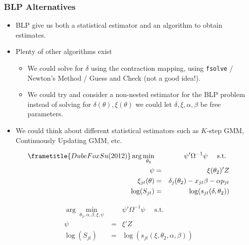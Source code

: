 \documentclass[xcolor=pdftex,dvipsnames,table,mathserif]{beamer}
\begin{document}
 \begin{frame}
\frametitle{BLP Alternatives}
\begin{itemize}
 \item BLP give us both a statistical \alert{estimator} and an \alert{algorithm} to obtain estimates.
\item Plenty of other algorithms exist
\begin{itemize}
\item We could solve for $\delta$ using the contraction mapping, using \texttt{fsolve} / Newton's Method / Guess and Check (not a good idea!).
\item We could try and consider a non-nested estimator for the BLP problem instead of solving for $\delta(\theta),\xi(\theta)$ we could let $\delta,\xi,\alpha,\beta$ be free parameters.
 \end{itemize}
\item We could think about different statistical estimators such as $K$-step GMM, Continuously Updating GMM, etc.
 \end{itemize}
\end{frame}
 \begin{frame}
 
\begin{eqnarray}
\frametitle{Dube Fox Su (2012)}
\label{blpnfxp}
\nonumber \arg \min_{\theta_2} && \psi' \Omega^{-1} \psi \quad \mbox{ s.t. } \\
\nonumber \psi &=& \xi(\theta_2)' Z\\
\xi_{jt}(\theta) &=& \delta_j(\theta_2) - x_{jt} \beta - \alpha p_{jt} \\
\nonumber \log(S_{jt})  &=& \log(s_{jt}(\delta,\theta_2))
\end{eqnarray}

\begin{eqnarray}
\label{blpmpec}
\nonumber \arg \min_{\theta_2,\alpha,\beta, \xi,\psi} && \psi' \Omega^{-1}  \psi \quad \mbox{ s.t. } \\
 \psi &=& \xi' Z\\
\nonumber \log(S_{jt})  &=& \log(s_{jt}(\xi,\theta_2, \alpha, \beta))
\end{eqnarray}
\end{frame}
\end{document}
